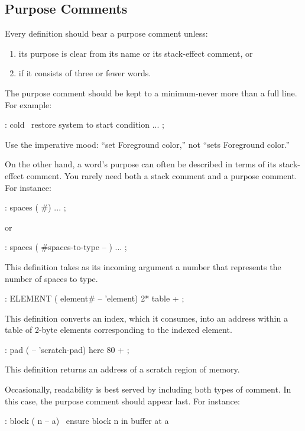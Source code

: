 \subsection{Purpose Comments}%

\begin{tip}
Every definition should bear a purpose comment unless:
\medskip
\begin{enumerate}
\item its purpose is clear from its name or its stack-effect comment, or
\item if it consists of three or fewer words.
\end{enumerate}
\end{tip}
The purpose comment should be kept to a minimum-never more than a full
line.  For example:
\begin{Code}
: cold   \ restore system to start condition
    ... ;
\end{Code}
Use the imperative mood: ``set Foreground color,'' not ``sets
Foreground color.''

On the other hand, a word's purpose can often be described in terms of
its stack-effect comment.  You rarely need both a stack comment and a
purpose comment.  For instance:
\begin{Code}
: spaces  ( #)   ... ;
\end{Code}
or
\begin{Code}
: spaces  ( #spaces-to-type -- )   ... ;
\end{Code}
This definition takes as its incoming argument a number that
represents the number of spaces to type.
\begin{Code}
: ELEMENT  ( element# -- 'element)  2*  table + ;
\end{Code}
This definition converts an index, which it consumes, into an address
within a table of 2-byte elements corresponding to the indexed element.
\begin{Code}
: pad  ( -- 'scratch-pad)  here  80 + ;
\end{Code}
This definition returns an address of a scratch region of memory.

Occasionally, readability is best served by including both types of
comment. In this case, the purpose comment should appear last.  For
instance:
\begin{Code}
: block  ( n -- a)  \   ensure block n in buffer at a
\end{Code}

